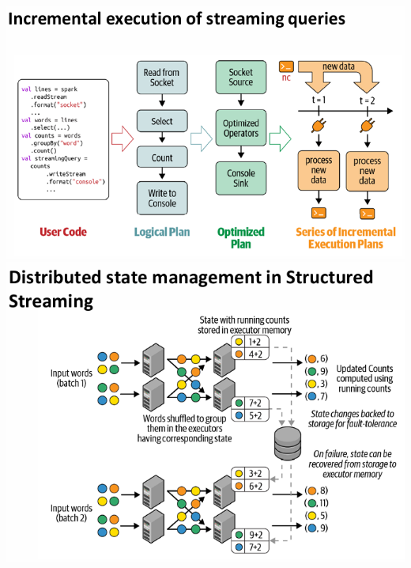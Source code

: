 \documentclass[10pt, landscape]{article}
\begin{document}
\begin{multicols*}{4}
  \includegraphics[width=0.95\linewidth]{incremental_excution_stream.png}
  \includegraphics[width=0.95\linewidth]{spark_stream_fault_tolerance.png}


\end{multicols*}
\end{document}
